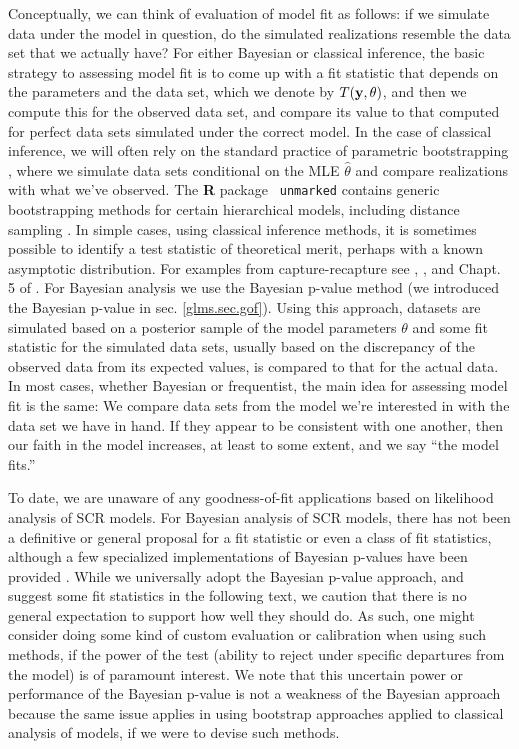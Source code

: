 Conceptually, we can think of evaluation of model fit as follows: if
we simulate data under the model in question, do the simulated
realizations resemble the data set that we actually have?  For either
Bayesian or classical inference, the basic strategy to assessing model
fit is to come up with a fit statistic that depends on the parameters
and the data set, which we denote by $T({\bf y}, \theta)$, and then we
compute this for the observed data set, and compare its value to that
computed for perfect data sets simulated under the correct model.  In
the case of classical inference, we will often rely on the standard
practice of parametric bootstrapping \citep{dixon:2002}, where we
simulate data sets conditional on the MLE $\hat{\theta}$ and compare
realizations with what we've observed.  The {\bf R} package \mbox{\tt
  unmarked} \citep{fiske_chandler:2011} contains generic bootstrapping
methods for certain hierarchical models, including distance sampling
\citep[e.g., see][for an application]{sillett_etal:2012}.  In simple
cases, using classical inference methods, it is sometimes possible to
identify a test statistic of theoretical merit, perhaps with a known
asymptotic distribution.  For examples from capture-recapture see
\citet{burnham_etal:1987}, \citet{lebreton_etal:1992}, and Chapt. 5 of
  \citet{cooch_white:2006}.  For Bayesian analysis we use the Bayesian
  p-value method \citep{gelman_etal:1996} (we introduced the Bayesian
  p-value in sec. \ref{glms.sec.gof}).  Using this approach, datasets
  are simulated based on a posterior sample of the model parameters
  $\theta$ and some fit statistic for the simulated data sets, usually
  based on the discrepancy of the observed data from its expected
  values, is compared to that for the actual data.  In most cases,
  whether Bayesian or frequentist, the main idea for assessing model
  fit is the same: We compare data sets from the model we're
  interested in with the data set we have in hand. If they appear to
  be consistent with one another, then our faith in the model
  increases, at least to some extent, and we say ``the model fits.''


To date, we are unaware of any goodness-of-fit applications based on
likelihood analysis of SCR models. For 
Bayesian analysis of SCR models, there has not been a definitive or
general proposal for a fit statistic or even a class of fit
statistics, although a few specialized implementations of Bayesian
p-values have been provided \citep{royle:2009,royle_etal:2011mee,
  gopalaswamy_etal:2012mee,gopalaswamy_etal:2012ecol,russell_etal:2012}.
While we universally adopt the Bayesian p-value approach, and suggest
some fit statistics in the following text, we caution that there is
no general expectation to support how well they should do.
As such, one might consider doing some kind of custom
evaluation or calibration when using such methods, if the power of the
test (ability to reject under specific departures from the model) is
of paramount interest.  We note that this uncertain power or
performance of the Bayesian p-value is not a weakness of the Bayesian
approach because the same issue applies in using bootstrap approaches
applied to classical analysis of models, if we were to devise such
methods.




